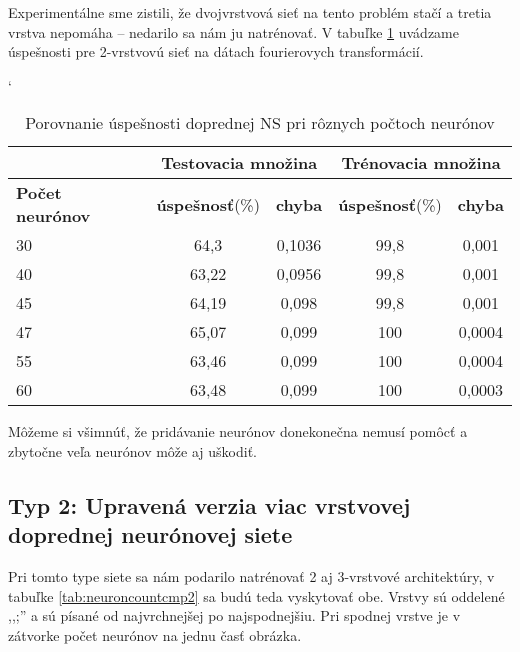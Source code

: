 Experimentálne sme zistili, že dvojvrstvová sieť na tento problém stačí a tretia vrstva nepomáha -- nedarilo sa nám ju natrénovať. V tabuľke \ref{tab:neuroncountcmp} uvádzame úspešnosti pre 2-vrstvovú sieť na dátach fourierovych transformácií.

\begin{table}[htp]
\catcode` %
\centering
\begin{tabular}{|l|c|c|c|c|}
\cline{2-5}
\multicolumn{1}{l}{} & \multicolumn{2}{|c|}{\textbf{Testovacia množina}} & \multicolumn{2}{c|}{\textbf{Trénovacia množina}}\\ 
\hline
\textbf{Počet neurónov} & \textbf{úspešnosť}(\%) & \textbf{chyba} & \textbf{úspešnosť}(\%) & \textbf{chyba} \\ \hline
30 & 64,3 & 0,1036 & 99,8 & 0,001 \\ \hline
40 & 63,22 & 0,0956 & 99,8 & 0,001 \\ \hline
45 & 64,19 & 0,098 & 99,8 & 0,001 \\ \hline
47 & 65,07 & 0,099 & 100 & 0,0004 \\ \hline
55 & 63,46 & 0,099 & 100 & 0,0004 \\ \hline
60 & 63,48 & 0,099 & 100 & 0,0003 \\ 
\hline
\end{tabular}
\caption{Porovnanie úspešnosti doprednej NS pri rôznych počtoch neurónov}
\label{tab:neuroncountcmp}
\end{table}

Môžeme si všimnúť, že pridávanie neurónov donekonečna nemusí pomôcť a zbytočne veľa neurónov môže aj uškodiť.

\subsection{Typ 2: Upravená verzia viac vrstvovej doprednej neurónovej siete}

Pri tomto type siete sa nám podarilo natrénovať 2 aj 3-vrstvové architektúry, v tabuľke \ref{tab:neuroncountcmp2} sa budú teda vyskytovať obe. Vrstvy sú oddelené ,,;'' a sú písané od najvrchnejšej po najspodnejšiu. Pri spodnej vrstve je v zátvorke počet neurónov na jednu časť obrázka.

